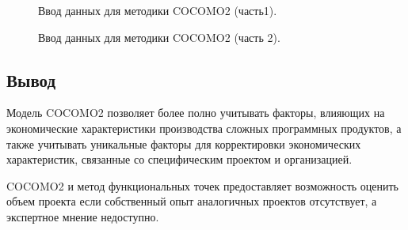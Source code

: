 \documentclass[a4paper,14pt]{article}
\begin{document}
\newpage
\begin{figure}[!h]
         \caption{Ввод данных для методики COCOMO2 (часть1).}
    \label{fig:input1}
\end{figure}

\newpage
\begin{figure}[!h]
         \caption{Ввод данных для методики COCOMO2 (часть 2).}
    \label{fig:input2}
\end{figure}

\subsection*{Вывод}

Модель COCOMO2 позволяет более полно учитывать факторы, влияющих на экономические характеристики производства сложных программных продуктов, а также учитывать уникальные факторы для корректировки экономических характеристик, связанные со специфическим проектом и организацией.

COCOMO2 и метод функциональных точек предоставляет возможность оценить объем проекта если собственный опыт аналогичных проектов отсутствует, а экспертное мнение недоступно.
\end{document}
